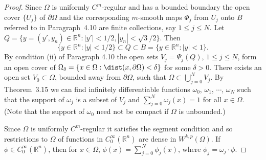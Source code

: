 \begin{proof}
  Since $\Omega$ is uniformly $C^m$-regular and has a bounded boundary
  the open cover $\{U_j\}$ of $\partial\Omega$ and the corresponding
  $m$-smooth maps $\Phi_j$ from $U_j$ onto $B$ referred to in Paragraph~4.10
  are finite collections, say $1\leq j\leq N$. Let
  $Q = \{y=(y',y_n)\in\mathbb{R}^n : |y'|<1/2, |y_n| < \sqrt3/2\}$. Then
  \[ \{y\in\mathbb{R}^n : |y|<1/2\} \subset Q \subset
      B = \{y\in\mathbb{R}^n : |y|<1\}. \]
  By condition (ii) of Paragraph 4.10 the open sets $V_j = \Psi_j(Q)$,
  $1\leq j\leq N$, form an open cover of $\Omega_{\delta} = \{x\in\Omega:
  \dist(x,\partial\Omega) < \delta\}$ for some $\delta>0$. There exists
  an open set $V_0\subset\Omega$, bounded away from $\partial\Omega$,
  such that $\Omega\subset\bigcup_{j=0}^N V_j$. By Theorem~3.15 we can
  find infinitely differentiable functions $\omega_0$, $\omega_1$, $\cdots$,
  $\omega_N$ such that the support of $\omega_j$ is a subset of $V_j$
  and $\sum_{j=0}^N \omega_j(x)=1$ for all $x\in\Omega$. (Note that the
  support of $\omega_0$ need not be compact if $\Omega$ is unbounded.)

  Since $\Omega$ is uniformly $C^m$-regular it satisfies the segment
  condition and so restrictions to $\Omega$ of functions in
  $C_0^\infty(\mathbb{R}^n)$ are dense in $W^{k,p}(\Omega)$.
  If $\phi\in C_0^\infty(\mathbb{R}^n)$, then for $x\in\Omega$,
  $\phi(x) = \sum_{j=0}^N \phi_j(x)$, where $\phi_j = \omega_j\cdot\phi$.


\end{proof}
